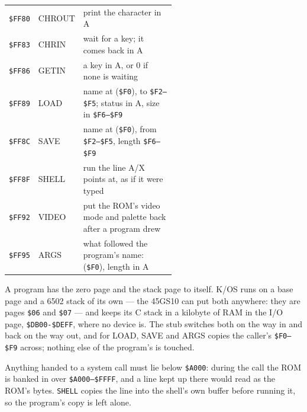 \begin{center}
\small
\begin{tabular}{@{}l l >{\raggedright\arraybackslash}p{0.56\linewidth}@{}}
\toprule
\texttt{\$FF80} & CHROUT & print the character in A \\
\texttt{\$FF83} & CHRIN  & wait for a key; it comes back in A \\
\texttt{\$FF86} & GETIN  & a key in A, or 0 if none is waiting \\
\texttt{\$FF89} & LOAD   & name at (\texttt{\$F0}), to \texttt{\$F2--\$F5}; status in A, size in \texttt{\$F6--\$F9} \\
\texttt{\$FF8C} & SAVE   & name at (\texttt{\$F0}), from \texttt{\$F2--\$F5}, length \texttt{\$F6--\$F9} \\
\texttt{\$FF8F} & SHELL  & run the line A/X points at, as if it were typed \\
\texttt{\$FF92} & VIDEO  & put the ROM's video mode and palette back after a program drew \\
\texttt{\$FF95} & ARGS   & what followed the program's name: (\texttt{\$F0}), length in A \\
\bottomrule
\end{tabular}
\end{center}

\noindent A program has the zero page and the stack page to itself.
K/OS runs on a base page and a 6502 stack of its own --- the 45GS10 can
put both anywhere: they are pages \texttt{\$06} and \texttt{\$07} ---
and keeps its C stack in a kilobyte of RAM in the I/O page,
\texttt{\$DB00-\$DEFF}, where no device is. The stub switches both on the way in and back on the way out,
and for LOAD, SAVE and ARGS copies the caller's \texttt{\$F0--\$F9}
across; nothing else of the program's is touched.

Anything handed to a system call must lie below
\texttt{\$A000}: during the call the ROM is banked in over
\texttt{\$A000--\$FFFF}, and a line kept up there would read as the ROM's
bytes. \verb|SHELL| copies the line into the shell's own buffer before
running it, so the program's copy is left alone.

